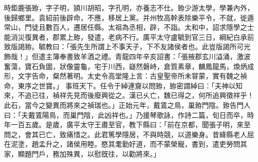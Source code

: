 \begin{pinyinscope}
時鉅鹿張臶，字子明，頴川胡昭，字孔明，亦養志不仕。臶少游太學，學兼內外，後歸鄉里。袁紹前後辟命，不應，移居上黨。并州牧高幹表除樂平令，不就，徙遁常山，門徒且數百人，遷居任縣。太祖為丞相，辟，不詣。太和中，詔求隱學之士能消災復異者，郡累上臶，發遣，老病不行。廣平太守盧毓到官三日，綱紀白承前致版謁臶。毓教曰：「張先生所謂上不事天子，下不友諸侯者也。此豈版謁所可光飾哉！」但遣主簿奉書致羊酒之禮。青龍四年辛亥詔書：「張掖郡玄川溢涌，激波奮蕩，寶石負圖，狀像靈龜，宅于川西，嶷然磐峙，倉質素章，麟鳳龍馬，煥炳成形，文字告命，粲然著明。太史令高堂隆上言：古皇聖帝所未甞蒙，實有魏之禎命，東序之世寶。」
事班天下。任令于綽連齎以問臶，臶密謂綽曰：「夫神以知來，不追已往，禎祥先見而後廢興從之。漢已乆亡，魏已得之，何所追興徵祥乎！此石，當今之變異而將來之禎瑞也。」正始元年，戴鵀之鳥，巢臶門陰。臶告門人曰：「夫戴鵀陽鳥，而巢門陰，此凶祥也。」乃援琴歌詠，作詩二篇，旬日而卒，時年一百五歲。是歲，廣平太守王肅至官，教下縣曰：「前在京都，聞張子明，來至問之，會其已亡，致痛惜之。此君篤學隱居，不與時競，以道樂身。昔絳縣老人屈在泥塗，趙孟升之，諸侯用睦。愍其耄勤好道，而不蒙榮寵，書到，遣吏勞問其家，顯題門戶，務加殊異，以慰旣往，以勸將來。」



\end{pinyinscope}
